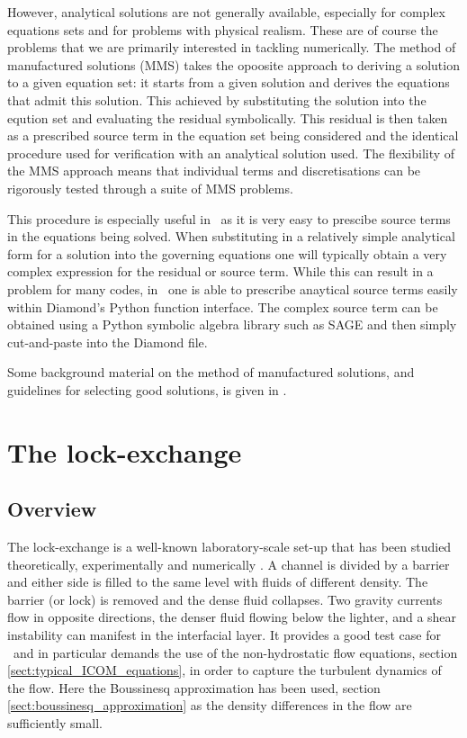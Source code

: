 However, analytical solutions are not generally available, especially for complex equations sets
and for problems with physical realism. These are of course the problems that we are primarily 
interested in tackling numerically.
The method of manufactured solutions (MMS) takes the opoosite approach to deriving a solution to 
a given equation set: it starts from a given solution and derives the equations that admit this
solution. This achieved by substituting the solution into the eqution set and evaluating the residual
symbolically. This residual is then taken as a prescribed source term in the equation set being considered
and the identical procedure used for verification with an analytical solution used. The flexibility of the MMS
approach means that individual terms and discretisations can be rigorously tested through a suite of MMS problems. 

This procedure is especially useful in \fluidity\ as it is very easy to prescibe source terms in the equations
being solved. When substituting in a relatively simple analytical form for a solution into the governing
equations one will typically obtain a very complex expression for the residual or source term. While this
can result in a problem for many codes, in \fluidity\ one is able to prescribe anaytical source terms easily
within Diamond's Python function interface. The complex source term can be obtained using a Python symbolic algebra
library such as SAGE and then simply cut-and-paste into the Diamond file.

Some background material on the method of manufactured solutions, and guidelines for selecting good solutions,
is given in \cite{salari2000}. 


\section{The lock-exchange}
\label{sect:lock_exchange}
\subsection{Overview}
\label{sect:lock_exchange_overview}

The lock-exchange is a well-known laboratory-scale set-up that has been studied theoretically, experimentally and numerically \citep{benjamin_68, klemp_94, hartel_00}. A channel is divided by a barrier and either side is filled to the same level with fluids of different density. The barrier (or lock) is removed and the dense fluid collapses. Two gravity currents flow in opposite directions, the denser fluid flowing below the lighter, and
a shear instability can manifest in the interfacial layer. It provides a good test case for \fluidity\ and in particular demands the use of the non-hydrostatic flow equations, section \ref{sect:typical_ICOM_equations}, in order to capture the turbulent dynamics of the flow. Here the Boussinesq approximation has been used, section \ref{sect:boussinesq_approximation} as the density differences in the flow are sufficiently small.

